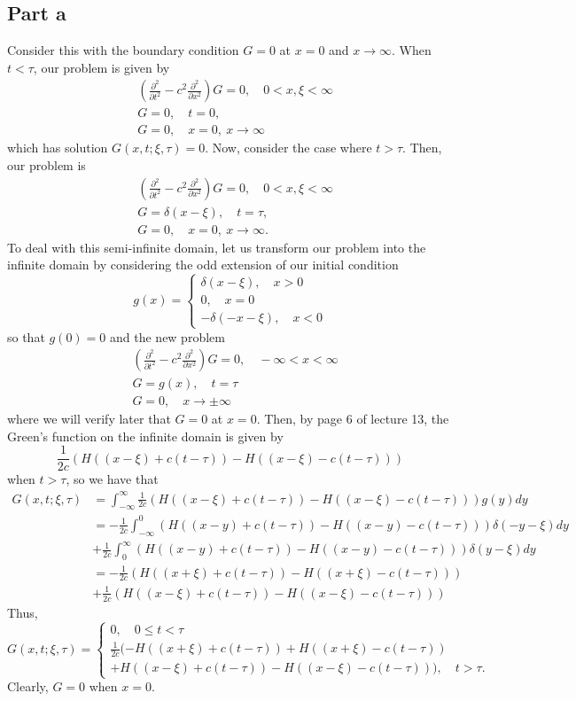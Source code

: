 \documentclass{article}
\begin{document}
\subsection{Part a}
Consider this with the boundary condition $G=0$ at $x=0$ and $x\to\infty$. When $t<\tau$, our problem is given by
\begin{align*}
	&\left(\frac{\partial^2}{\partial t^2}-c^2\frac{\partial^2}{\partial x^2}\right)G=0, \quad 0<x,\xi<\infty\\
	&G=0, \quad t=0,\\
	&G=0, \quad x=0,~x\to\infty
\end{align*}
which has solution $G(x,t;\xi,\tau)=0$. Now, consider the case where $t>\tau$. Then, our problem is
\begin{align*}
	&\left(\frac{\partial^2}{\partial t^2}-c^2\frac{\partial^2}{\partial x^2}\right)G=0, \quad 0<x,\xi<\infty\\
	&G=\delta(x-\xi), \quad t=\tau,\\
	&G=0, \quad x=0,~x\to\infty.
\end{align*}
To deal with this semi-infinite domain, let us transform our problem into the infinite domain by considering the odd extension of our initial condition 
\[
g(x)=\begin{cases}
	\delta(x-\xi), \quad x>0\\
	0, \quad x=0\\
	-\delta(-x-\xi), \quad x<0
\end{cases}
\]
so that $g(0)=0$ and the new problem
\begin{align*}
	&\left(\frac{\partial^2}{\partial t^2}-c^2\frac{\partial^2}{\partial x^2}\right)G=0, \quad -\infty<x<\infty\\
	&G=g(x), \quad t=\tau\\
	&G=0, \quad x\to\pm\infty
\end{align*}
where we will verify later that $G=0$ at $x=0$. Then, by page 6 of lecture 13, the Green's function on the infinite domain is given by
\[
\frac{1}{2c}\left(H((x-\xi)+c(t-\tau))-H((x-\xi)-c(t-\tau))\right)
\]
when $t>\tau$, so we have that 
\begin{align*}
	G(x,t;\xi,\tau)&=\int_{-\infty}^\infty\frac{1}{2c}\left(H((x-\xi)+c(t-\tau))-H((x-\xi)-c(t-\tau))\right)g(y)dy\\&=
	-\frac{1}{2c}\int_{-\infty}^0\left(H((x-y)+c(t-\tau))-H((x-y)-c(t-\tau))\right)\delta(-y-\xi)dy\\&+\frac{1}{2c}\int_{0}^\infty \left(H((x-y)+c(t-\tau))-H((x-y)-c(t-\tau))\right)\delta(y-\xi)dy\\&=
	-\frac{1}{2c}\left(H((x+\xi)+c(t-\tau))-H((x+\xi)-c(t-\tau))\right)\\&+\frac{1}{2c} \left(H((x-\xi)+c(t-\tau))-H((x-\xi)-c(t-\tau))\right)
\end{align*}
Thus,
\[
G(x,t;\xi,\tau)=\begin{cases}
	0, \quad 0\leq t<\tau\\
	\frac{1}{2c}(-H((x+\xi)+c(t-\tau))+H((x+\xi)-c(t-\tau))\\+H((x-\xi)+c(t-\tau))-H((x-\xi)-c(t-\tau))), \quad t>\tau.
\end{cases}
\]
Clearly, $G=0$ when $x=0$.  
\end{document}
